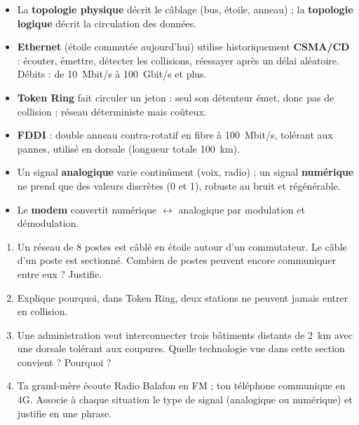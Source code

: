 \documentclass[11pt]{article}
\begin{document}
\begin{aretenir}
\begin{itemize}
\item La \textbf{topologie physique} décrit le câblage (bus, étoile, anneau) ; la \textbf{topologie logique} décrit la circulation des données.
\item \textbf{Ethernet} (étoile commutée aujourd'hui) utilise historiquement \textbf{CSMA/CD} : écouter, émettre, détecter les collisions, réessayer après un délai aléatoire. Débits : de \SI{10}{Mbit/s} à \SI{100}{Gbit/s} et plus.
\item \textbf{Token Ring} fait circuler un jeton : seul son détenteur émet, donc pas de collision ; réseau déterministe mais coûteux.
\item \textbf{FDDI} : double anneau contra-rotatif en fibre à \SI{100}{Mbit/s}, tolérant aux pannes, utilisé en dorsale (longueur totale \SI{100}{km}).
\item Un signal \textbf{analogique} varie continûment (voix, radio) ; un signal \textbf{numérique} ne prend que des valeurs discrètes (0 et 1), robuste au bruit et régénérable.
\item Le \textbf{modem} convertit numérique $\leftrightarrow$ analogique par modulation et démodulation.
\end{itemize}
\end{aretenir}

\begin{exercice}
\begin{enumerate}
\item Un réseau de 8 postes est câblé en étoile autour d'un commutateur. Le câble d'un poste est sectionné. Combien de postes peuvent encore communiquer entre eux ? Justifie.
\item Explique pourquoi, dans Token Ring, deux stations ne peuvent jamais entrer en collision.
\item Une administration veut interconnecter trois bâtiments distants de \SI{2}{km} avec une dorsale tolérant aux coupures. Quelle technologie vue dans cette section convient ? Pourquoi ?
\item Ta grand-mère écoute Radio Balafon en FM ; ton téléphone communique en 4G. Associe à chaque situation le type de signal (analogique ou numérique) et justifie en une phrase.
\end{enumerate}
\end{exercice}
\end{document}
